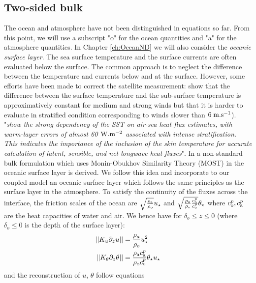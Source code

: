 \subsection{Two-sided bulk}
\label{sec:airseaSCM_twoSided}
The ocean and atmosphere have not been distinguished in equations
so far. From this point, we will use a subscript "o" for the ocean
quantities and "a" for the atmosphere quantities.
In Chapter \ref{ch:OceanND} we will also consider the
\textit{oceanic surface layer}.
The sea surface temperature and the surface currents are often
evaluated below the surface. The common approach is
to neglect the difference between the temperature and currents
below and at the surface. However,
some efforts have been made to correct the satellite
measurement: \citep{donlon_toward_2002} show that
the difference between
the surface temperature and the sub-surface temperature is
approximatively constant for medium and strong winds but that 
it is harder to evaluate in stratified condition corresponding
to winds slower than $6 \; {\rm m}.{\rm s}^{-1}$).
\citep{ward_near-surface_2006}
"\textit{show the strong dependency of the SST on air-sea heat
flux estimates, with warm-layer errors of almost
60 ${\rm W}.{\rm m}^{-2}$ associated with intense stratification. This indicates
the importance of the inclusion of the skin temperature for
accurate calculation of latent, sensible, and net longwave
heat fluxes}".
In \citep{pelletier_two-sided_2021} a non-standard bulk formulation
which uses Monin-Obukhov Similarity Theory (MOST) in the oceanic
surface layer is derived.
We follow this idea and incorporate to our coupled model an
oceanic surface layer which follows the same principles as
the surface layer in the atmosphere.
To satisfy the continuity of the fluxes across the interface,
the friction scales of the ocean are
$\sqrt{\frac{\rho_{\rm a}} {\rho_{\rm o}}} u_\star$ and
$\sqrt{\frac{\rho_{\rm a}}{\rho_{\rm o}}
\frac{c_{\rm a}^p}{c_{\rm o}^p}}
\theta_\star$ where $c_{\rm o}^p, c_{\rm a}^p$
are the heat capacities of water and air.
We hence have for $\delta_o \leq z \leq 0$ (where $\delta_o \leq 0$
is the depth of the surface layer):
\begin{equation}
	\begin{aligned}
	||K_u \partial_z u|| &= \frac{\rho_a}{\rho_o}
	u_\star^2\\
	||K_\theta \partial_z \theta|| &=
	\frac{\rho_{\rm a} c_{\rm a}^p}{\rho_{\rm o} c_{\rm o}^p}
	\theta_\star u_\star
	\end{aligned}
\end{equation}
and the reconstruction of $u$, $\theta$ follow equations
